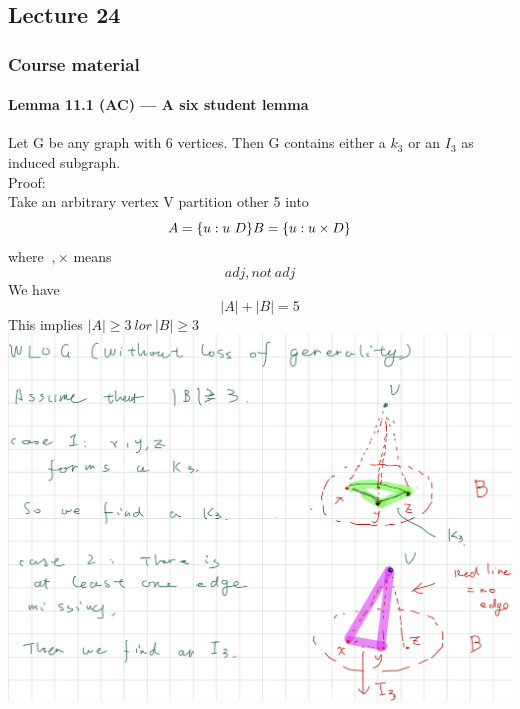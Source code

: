 \documentclass{article}
\begin{document}
\subsection{Lecture 24}
\subsubsection{Course material}
\paragraph{Lemma 11.1 (AC) — A six student lemma}
Let G be any graph with 6 vertices. Then G contains either a $k_3$ or an $I_3$ as induced subgraph.\\
Proof:\\
Take an arbitrary vertex V partition other 5 into $$A=\{u:u~D\}\\B=\{u: u\times D\}$$ where $ ~,\times$ means $$adj,not\ adj$$
We have $$|A|+|B|=5$$
This implies $|A|\ge 3 \ lor\  |B|\ge 3$\\
\includegraphics{0110}
\end{document}
